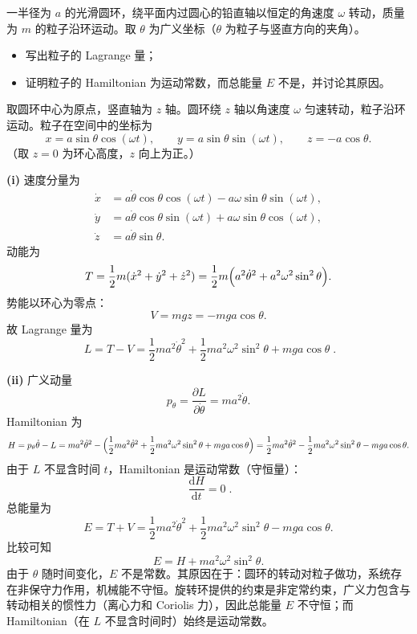 \begin{question}
一半径为 \(a\) 的光滑圆环，绕平面内过圆心的铅直轴以恒定的角速度 \(\omega\) 转动，质量为 \(m\) 的粒子沿环运动。取 \(\theta\) 为广义坐标（\(\theta\) 为粒子与竖直方向的夹角）。

\begin{itemize}
  \item[\textup{(i)}] 写出粒子的 Lagrange 量；
  \item[\textup{(ii)}] 证明粒子的 Hamiltonian 为运动常数，而总能量 \(E\) 不是，并讨论其原因。
\end{itemize}
\begin{solution}
取圆环中心为原点，竖直轴为 \(z\) 轴。圆环绕 \(z\) 轴以角速度 \(\omega\) 匀速转动，粒子沿环运动。粒子在空间中的坐标为
\[
x = a\sin\theta\cos(\omega t),\qquad
y = a\sin\theta\sin(\omega t),\qquad
z = -a\cos\theta .
\]
（取 \(z=0\) 为环心高度，\(z\) 向上为正。）

\textbf{(i)} 速度分量为
\begin{align*}
\dot x &= a\dot\theta\cos\theta\cos(\omega t) - a\omega\sin\theta\sin(\omega t),\\
\dot y &= a\dot\theta\cos\theta\sin(\omega t) + a\omega\sin\theta\cos(\omega t),\\
\dot z &= a\dot\theta\sin\theta .
\end{align*}
动能为
\[
T = \frac12 m(\dot x^2 + \dot y^2 + \dot z^2)
= \frac12 m\Bigl(a^2\dot\theta^2 + a^2\omega^2\sin^2\theta\Bigr).
\]
势能以环心为零点：
\[
V = mgz = -mg a\cos\theta .
\]
故 Lagrange 量为
\[
\boxed{\;L = T - V
= \frac12 m a^2\dot\theta^2 + \frac12 m a^2\omega^2\sin^2\theta + mg a\cos\theta\;}.
\]

\textbf{(ii)} 广义动量
\[
p_\theta = \frac{\partial L}{\partial\dot\theta} = m a^2\dot\theta .
\]
Hamiltonian 为
\[
H = p_\theta\dot\theta - L
= m a^2\dot\theta^2
- \Bigl(\frac12 m a^2\dot\theta^2 + \frac12 m a^2\omega^2\sin^2\theta + mg a\cos\theta\Bigr)
= \frac12 m a^2\dot\theta^2 - \frac12 m a^2\omega^2\sin^2\theta - mg a\cos\theta .
\]
由于 \(L\) 不显含时间 \(t\)，Hamiltonian 是运动常数（守恒量）：
\[
\boxed{\;\frac{\mathrm d H}{\mathrm d t} = 0\;}.
\]
总能量为
\[
E = T + V
= \frac12 m a^2\dot\theta^2 + \frac12 m a^2\omega^2\sin^2\theta - mg a\cos\theta .
\]
比较可知
\[
E = H + m a^2\omega^2\sin^2\theta .
\]
由于 \(\theta\) 随时间变化，\(E\) 不是常数。其原因在于：圆环的转动对粒子做功，系统存在非保守力作用，机械能不守恒。旋转环提供的约束是非定常约束，广义力包含与转动相关的惯性力（离心力和 Coriolis 力），因此总能量 \(E\) 不守恒；而 Hamiltonian（在 \(L\) 不显含时间时）始终是运动常数。
\end{solution}
\end{question}

